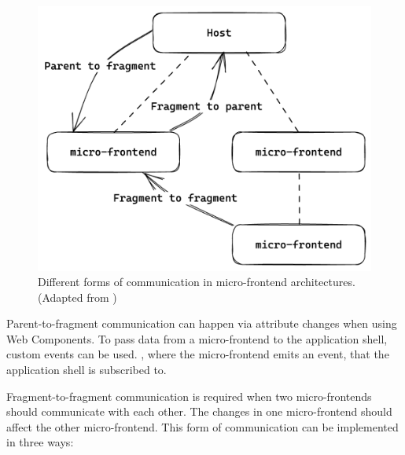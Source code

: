 \ifshowImages
\begin{figure}[H]
    \centering
    \includegraphics[width=0.5\linewidth]{images/background/micro-frontends/communication/communication-patterns.png}
    \caption{Different forms of communication in micro-frontend architectures. (Adapted from \cite[100]{book:2020:geers:background:micro-frontends:micro-frontends-in-action})}\label{fig:background:micro-frontend:communication:communication-patterns}
\end{figure}
\fi

\bigskip

\noindent Parent-to-fragment communication can happen via attribute changes when using Web Components. \cite[58-59]{book:2019:farrell:background:micro-frontends:web-components-in-action} To pass data from a micro-frontend to the application shell, custom events can be used. \cite[315]{book:2019:farrell:background:micro-frontends:web-components-in-action}, where the micro-frontend emits an event, that the application shell is subscribed to. \cite{book:2020:geers:background:micro-frontends:micro-frontends-in-action}

\bigskip

\noindent Fragment-to-fragment communication is required when two micro-frontends should communicate with each other. The changes in one micro-frontend should affect the other micro-frontend. This form of communication can be implemented in three ways: \cite[107-108]{book:2020:geers:background:micro-frontends:micro-frontends-in-action}

